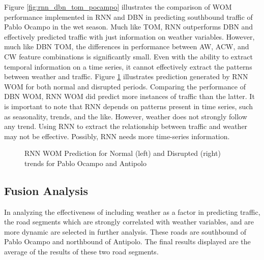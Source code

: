 Figure \ref{fig:rnn_dbn_tom_pocampo} illustrates the comparison of WOM performance implemented in RNN and DBN in predicting southbound traffic of Pablo Ocampo in the wet season. Much like TOM, RNN outperforms DBN and effectively predicted traffic with just information on weather variables. However, much like DBN TOM, the differences in performance between AW, ACW, and CW feature combinations is significantly small. Even with the ability to extract temporal information on a time series, it cannot effectively extract the patterns between weather and traffic. Figure \ref{fig:RNN_WOM_normal_disrption_pocampo_antipolo_wet} illustrates prediction generated by RNN WOM for both normal and disrupted periods. Comparing the performance of DBN WOM, RNN WOM did predict more instances of traffic than the latter. It is important to note that RNN depends on patterns present in time series, such as seasonality, trends, and the like. However, weather does not strongly follow any trend. Using RNN to extract the relationship between traffic and weather may not be effective. Possibly, RNN needs more time-series information. 

\begin{figure}[!t]
  \centering
  \captionsetup{justification=centering}
  \caption{RNN WOM Prediction for Normal (left) and Disrupted (right) trends for Pablo Ocampo and Antipolo}
  \label{fig:RNN_WOM_normal_disrption_pocampo_antipolo_wet}
\end{figure}

\subsection{Fusion Analysis}
In analyzing the effectiveness of including weather as a factor in predicting traffic, the road segments which are strongly correlated with weather variables, and are more dynamic are selected in further analysis. These roads are southbound of Pablo Ocampo and northbound of Antipolo. The final results displayed are the average of the results of these two road segments.

